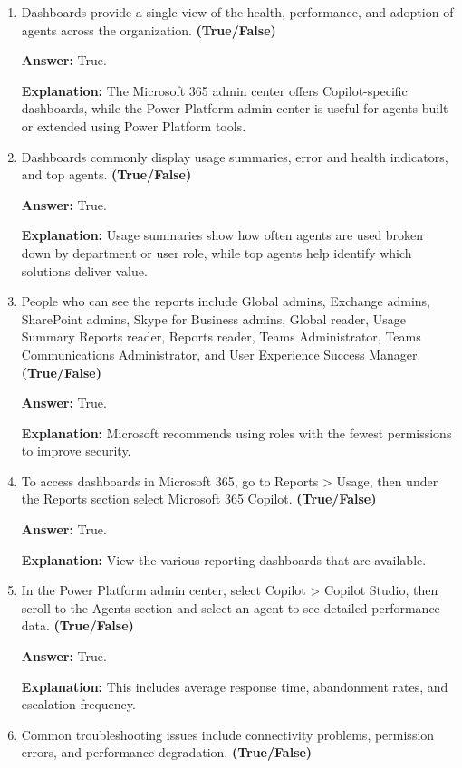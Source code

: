 \documentclass[10pt]{article}
\begin{document}
\begin{enumerate}[leftmargin=*]
\item Dashboards provide a single view of the health, performance, and adoption of agents across the organization. \textbf{(True/False)}

\textbf{Answer:} True.

\textbf{Explanation:} The Microsoft 365 admin center offers Copilot-specific dashboards, while the Power Platform admin center is useful for agents built or extended using Power Platform tools.

\item Dashboards commonly display usage summaries, error and health indicators, and top agents. \textbf{(True/False)}

\textbf{Answer:} True.

\textbf{Explanation:} Usage summaries show how often agents are used broken down by department or user role, while top agents help identify which solutions deliver value.

\item People who can see the reports include Global admins, Exchange admins, SharePoint admins, Skype for Business admins, Global reader, Usage Summary Reports reader, Reports reader, Teams Administrator, Teams Communications Administrator, and User Experience Success Manager. \textbf{(True/False)}

\textbf{Answer:} True.

\textbf{Explanation:} Microsoft recommends using roles with the fewest permissions to improve security.

\item To access dashboards in Microsoft 365, go to Reports > Usage, then under the Reports section select Microsoft 365 Copilot. \textbf{(True/False)}

\textbf{Answer:} True.

\textbf{Explanation:} View the various reporting dashboards that are available.

\item In the Power Platform admin center, select Copilot > Copilot Studio, then scroll to the Agents section and select an agent to see detailed performance data. \textbf{(True/False)}

\textbf{Answer:} True.

\textbf{Explanation:} This includes average response time, abandonment rates, and escalation frequency.

\item Common troubleshooting issues include connectivity problems, permission errors, and performance degradation. \textbf{(True/False)}


\end{enumerate}
\end{document}
